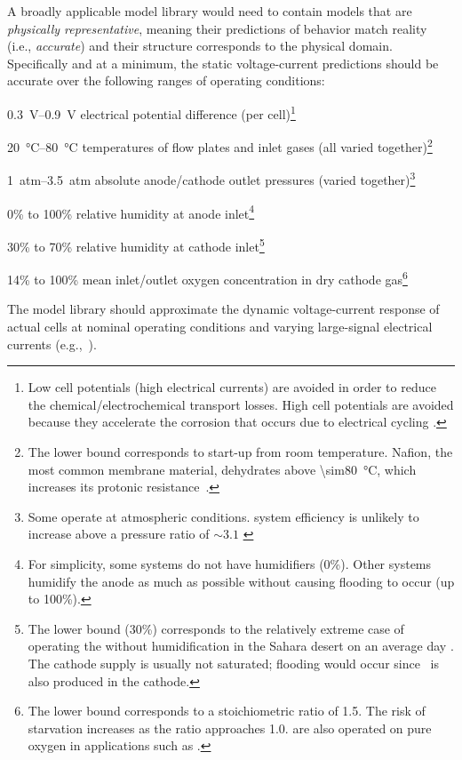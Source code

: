 A broadly applicable  model library would need to contain models that are \emph{physically representative}, meaning their predictions of behavior match reality (i.e., \emph{accurate}) and their structure corresponds to the physical domain.  Specifically and at a minimum, the static voltage-current predictions should be accurate over the following ranges of operating conditions:
\begin{itemize*}
\item \SIrange{0.3}{0.9}{V} electrical potential difference (per cell)\footnote{Low cell potentials (high electrical currents) are avoided in order to reduce the chemical\slash{}electrochemical transport losses.  High cell potentials are avoided because they accelerate the corrosion that occurs due to electrical cycling \cite[pp.~6--7]{Schmittinger2008}.}
\item \SIrange{20}{80}{\celsius} temperatures of flow plates and inlet gases (all varied together)\footnote{The lower bound corresponds to start-up from room temperature.  Nafion, the most common membrane material, dehydrates above \SI{\sim80}{\celsius}, which increases its protonic resistance~\cite{Hallinan2010}.}
\item \SIrange{1}{3.5}{atm} absolute anode\slash{}cathode outlet pressures (varied together)\footnote{Some  operate at atmospheric conditions.   system efficiency is unlikely to increase above a pressure ratio of ${\sim}3.1$ \cite[p.~107]{Larminie2003}}
\item 0\% to 100\% relative humidity at anode inlet\footnote{For simplicity, some  systems do not have humidifiers (0\%).  Other systems humidify the anode as much as possible without causing flooding to occur (up to 100\%).}
\item 30\% to 70\% relative humidity at cathode inlet\footnote{The lower bound (30\%) corresponds to the relatively extreme case of operating the  without humidification in the Sahara desert on an average day \cite[p.~78]{Larminie2003}.  The cathode supply is usually not saturated; flooding would occur since ~is also produced in the cathode.}
\item 14\% to 100\% mean inlet\slash{}outlet oxygen concentration in dry cathode gas\footnote{The lower bound corresponds to a stoichiometric ratio of 1.5.  The risk of starvation increases as the ratio approaches 1.0.   are also operated on pure oxygen in applications such as .}
\end{itemize*}
The  model library should approximate the dynamic voltage-current response of actual cells at nominal operating conditions and varying large-signal electrical currents (e.g.,~\cite{Wagner1998}). %
